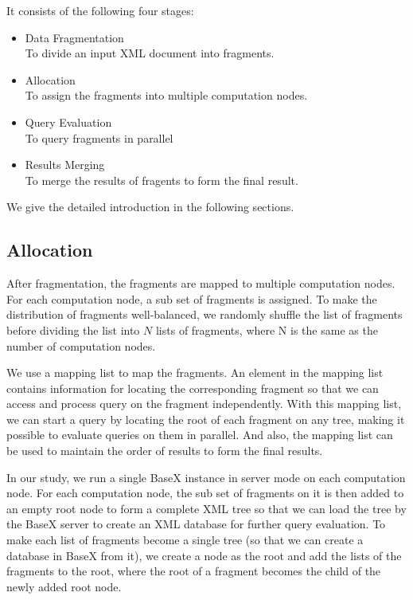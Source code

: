 It consists of the following four stages:\\
\begin{itemize}
	\item Data Fragmentation \\To divide an input XML document into fragments.
	\item Allocation\\ To assign the fragments into multiple computation nodes.
	\item Query Evaluation\\ To query fragments in parallel
	\item Results Merging\\ To merge the results of fragents to form the final result.
\end{itemize}



We give the detailed introduction in the following sections.



\subsection{Allocation}

After fragmentation, the fragments are mapped to multiple computation nodes. For each
computation node, a sub set of fragments is assigned. To make the distribution
of fragments well-balanced, we randomly shuffle the list of fragments before
dividing the list into $N$ lists of fragments, where N is the same as the number
of computation nodes. 

We use a mapping list to map the fragments. An element in the mapping list
contains information for locating the corresponding fragment so that we can
access and process query on the fragment independently.  With this mapping list,
we can start a query by locating the root of each fragment on any tree, making
it possible to evaluate queries on them in parallel.  And also, the mapping list
can be used to maintain the order of results to form the final results.

In our study, we run a single BaseX instance in server mode on each computation
node. For each computation node, the sub set of fragments on it is then added to
an empty root node to form a complete XML tree so that we can load the tree by
the BaseX server to create an XML database for further query evaluation. To make
each list of fragments become a single tree (so that we can create a database in
BaseX from it),  we create a node as the root and add the lists of the fragments
to the root, where the root of a fragment becomes the child of the newly added
root node. 

